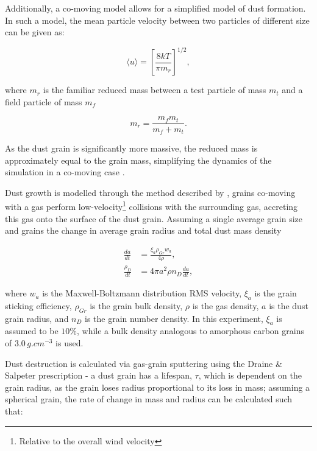 Additionally, a co-moving model allows for a simplified model of dust formation. In such a model, the mean particle velocity between two particles of different size can be given as:

\begin{equation}
  \langle u \rangle = \left[ \frac{8kT}{\pi m_r} \right] ^{1/2} ,
\end{equation}

where $m_r$ is the familiar reduced mass between a test particle of mass $m_t$ and a field particle of mass $m_f$

\begin{equation}
  m_r = \frac{m_f m_t}{m_f + m_t} .
\end{equation}

As the dust grain is significantly more massive, the reduced mass is approximately equal to the grain mass, simplifying the dynamics of the simulation in a co-moving case \parencite{spitzer_jr._physical_2008}.

Dust growth is modelled through the method described by \cite{spitzer_jr._physical_2008}, grains co-moving with a gas perform low-velocity\footnote{Relative to the overall wind velocity} collisions with the surrounding gas, accreting this gas onto the surface of the dust grain. Assuming a single average grain size and grains  the change in average grain radius and total dust mass density

\begin{subequations}
  \begin{align}
        \frac{da}{dt} & = \frac{\xi_a \rho_{Gr} w_a}{4 \rho} , \\
    \frac{\rho_D}{dt} & = 4 \pi a^2 \rho n_D \frac{da}{dt}   , 
  \end{align}
\end{subequations}

where $w_a$ is the Maxwell-Boltzmann distribution RMS velocity, $\xi_a$ is the grain sticking efficiency, $\rho_{Gr}$ is the grain bulk density, $\rho$ is the gas density, $a$ is the dust grain radius, and $n_D$ is the grain number density. In this experiment, $\xi_a$ is assumed to be $10\%$, while a bulk density analogous to amorphous carbon grains of $3.0 \, \si{g.cm^{-3}}$ is used.

Dust destruction is calculated via gas-grain sputtering using the Draine \& Salpeter prescription - a dust grain has a lifespan, $\tau$, which is dependent on the grain radius, as the grain loses radius proportional to its loss in mass; assuming a spherical grain, the rate of change in mass and radius can be calculated such that:

